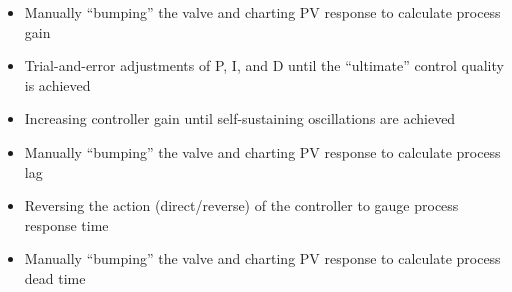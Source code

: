 \begin{itemize}
\item{} Manually ``bumping'' the valve and charting PV response to calculate process gain
\vskip 5pt 
\item{} Trial-and-error adjustments of P, I, and D until the ``ultimate'' control quality is achieved
\vskip 5pt 
\item{} Increasing controller gain until self-sustaining oscillations are achieved
\vskip 5pt 
\item{} Manually ``bumping'' the valve and charting PV response to calculate process lag 
\vskip 5pt 
\item{} Reversing the action (direct/reverse) of the controller to gauge process response time
\vskip 5pt 
\item{} Manually ``bumping'' the valve and charting PV response to calculate process dead time 
\end{itemize}




